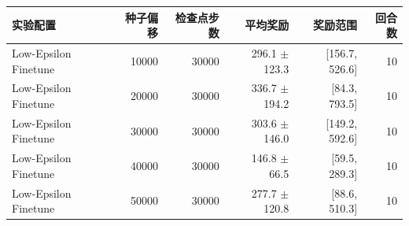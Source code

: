 \begin{tabular}{lrrrrr}\toprule
实验配置 & 种子偏移 & 检查点步数 & 平均奖励 & 奖励范围 & 回合数 \\
\midrule
Low-Epsilon Finetune & 10000 & 30000 & 296.1 $\pm$ 123.3 & [156.7, 526.6] & 10 \\
Low-Epsilon Finetune & 20000 & 30000 & 336.7 $\pm$ 194.2 & [84.3, 793.5] & 10 \\
Low-Epsilon Finetune & 30000 & 30000 & 303.6 $\pm$ 146.0 & [149.2, 592.6] & 10 \\
Low-Epsilon Finetune & 40000 & 30000 & 146.8 $\pm$ 66.5 & [59.5, 289.3] & 10 \\
Low-Epsilon Finetune & 50000 & 30000 & 277.7 $\pm$ 120.8 & [88.6, 510.3] & 10 \\
\bottomrule
\end{tabular}
